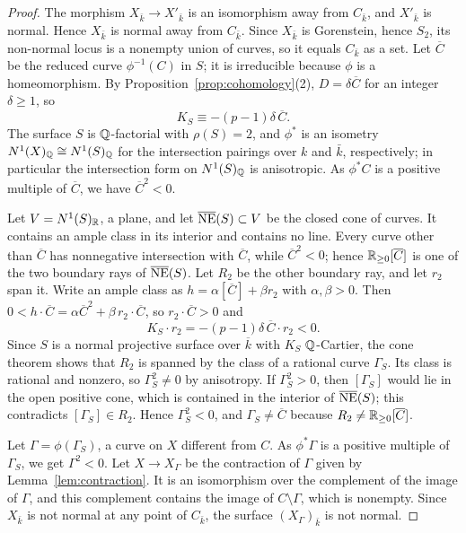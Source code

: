 \begin{proof}
The morphism $X_{\bar k}\to X'_{\bar k}$ is an isomorphism away from $C_{\bar k}$, and $X'_{\bar k}$ is normal.
Hence $X_{\bar k}$ is normal away from $C_{\bar k}$.
Since $X_{\bar k}$ is Gorenstein, hence $S_2$, its non-normal locus is a nonempty union of curves, so it equals $C_{\bar k}$ as a set.
Let $\overline C$ be the reduced curve $\phi^{-1}(C)$ in $S$; it is irreducible because $\phi$ is a homeomorphism.
By Proposition~\ref{prop:cohomology}(2), $D = \delta\overline C$ for an integer $\delta\geq 1$, so
\[
  K_S\equiv-(p-1)\delta\,\overline C.
\]
The surface $S$ is $\mathbb{Q}$-factorial with $\rho(S) = 2$, and $\phi^*$ is an isometry $N^1(X)_{\mathbb{Q}}\cong N^1(S)_{\mathbb{Q}}$ for the intersection pairings over $k$ and $\bar k$, respectively; in particular the intersection form on $N^1(S)_{\mathbb{Q}}$ is anisotropic.
As $\phi^*C$ is a positive multiple of $\overline C$, we have $\overline C^2<0$.

Let $V = N^1(S)_{\mathbb{R}}$, a plane, and let $\overline{\operatorname{NE}}(S)\subset V$ be the closed cone of curves.
It contains an ample class in its interior and contains no line.
Every curve other than $\overline C$ has nonnegative intersection with $\overline C$, while $\overline C^2<0$; hence $\mathbb{R}_{\geq 0}[\overline C]$ is one of the two boundary rays of $\overline{\operatorname{NE}}(S)$.
Let $R_2$ be the other boundary ray, and let $r_2$ span it.
Write an ample class as $h = \alpha[\overline C]+\beta r_2$ with $\alpha,\beta>0$.
Then $0<h\cdot\overline C = \alpha\overline C^2+\beta\,r_2\cdot\overline C$, so $r_2\cdot\overline C>0$ and
\[
  K_S\cdot r_2 = -(p-1)\delta\,\overline C\cdot r_2<0.
\]
Since $S$ is a normal projective surface over $\overline k$ with $K_S$ $\mathbb{Q}$-Cartier, the cone theorem \cite[Theorem~3.13 and Proposition~3.15]{Tan14} shows that $R_2$ is spanned by the class of a rational curve $\Gamma_S$.
Its class is rational and nonzero, so $\Gamma_S^2\neq 0$ by anisotropy.
If $\Gamma_S^2>0$, then $[\Gamma_S]$ would lie in the open positive cone, which is contained in the interior of $\overline{\operatorname{NE}}(S)$; this contradicts $[\Gamma_S]\in R_2$.
Hence $\Gamma_S^2<0$, and $\Gamma_S\neq\overline C$ because $R_2\neq\mathbb{R}_{\geq 0}[\overline C]$.

Let $\Gamma = \phi(\Gamma_S)$, a curve on $X$ different from $C$.
As $\phi^*\Gamma$ is a positive multiple of $\Gamma_S$, we get $\Gamma^2<0$.
Let $X\to X_\Gamma$ be the contraction of $\Gamma$ given by Lemma~\ref{lem:contraction}.
It is an isomorphism over the complement of the image of $\Gamma$, and this complement contains the image of $C\setminus\Gamma$, which is nonempty.
Since $X_{\bar k}$ is not normal at any point of $C_{\bar k}$, the surface $(X_\Gamma)_{\bar k}$ is not normal.
\end{proof}

